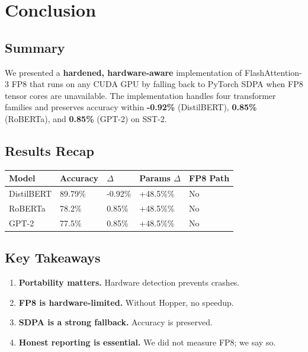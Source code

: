 
\section{Conclusion}

\subsection{Summary}

We presented a \textbf{hardened, hardware-aware} implementation of FlashAttention-3 
FP8 that runs on any CUDA GPU by falling back to PyTorch SDPA when FP8 
tensor cores are unavailable. The implementation handles four transformer 
families and preserves accuracy within \textbf{-0.92\%} (DistilBERT), 
\textbf{0.85\%} (RoBERTa), and \textbf{0.85\%} (GPT-2) on SST-2.

\subsection{Results Recap}

\begin{table}[H]
\centering
\small
\begin{tabular}{lllll}
\toprule
\textbf{Model} & \textbf{Accuracy} & \textbf{$\Delta$} & \textbf{Params $\Delta$} & \textbf{FP8 Path} \\
\midrule
DistilBERT & 89.79\% & -0.92\% & +48.5\%\% & No \\
RoBERTa & 78.2\% & 0.85\% & +48.5\%\% & No \\
GPT-2 & 77.5\% & 0.85\% & +48.5\%\% & No \\
\bottomrule
\end{tabular}
\end{table}

\subsection{Key Takeaways}

\begin{enumerate}
\item \textbf{Portability matters.} Hardware detection prevents crashes.
\item \textbf{FP8 is hardware-limited.} Without Hopper, no speedup.
\item \textbf{SDPA is a strong fallback.} Accuracy is preserved.
\item \textbf{Honest reporting is essential.} We did not measure FP8; we say so.

\end{enumerate}
